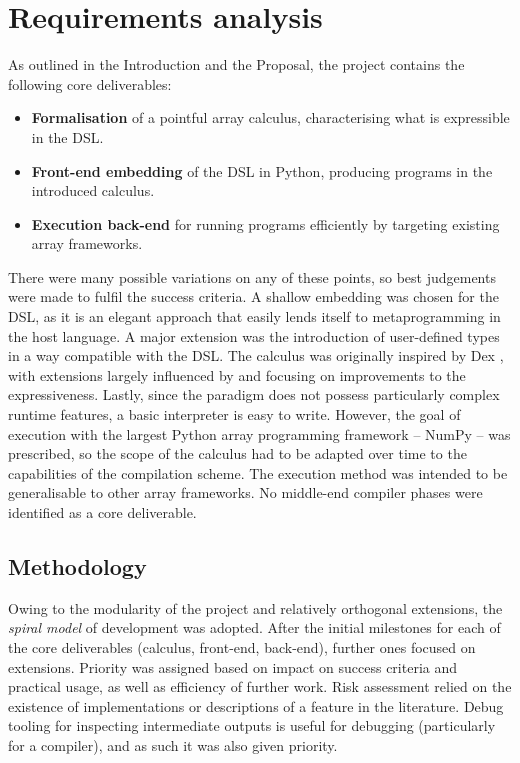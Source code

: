\section{Requirements analysis}
\label{requirements-analysis}

As outlined in the Introduction and the Proposal, the project contains the following core deliverables:
\begin{itemize}
    \item \textbf{Formalisation} of a pointful array calculus, characterising what is expressible in the DSL.
    \item \textbf{Front-end embedding} of the DSL in Python, producing programs in the introduced calculus.
    \item \textbf{Execution back-end} for running programs efficiently by targeting existing array frameworks.
\end{itemize}
There were many possible variations on any of these points, so best judgements were made to fulfil the success criteria. A shallow embedding was chosen for the DSL, as it is an elegant approach that easily lends itself to metaprogramming in the host language. A major extension was the introduction of user-defined types in a way compatible with the DSL. The calculus was originally inspired by Dex \cite{paszke2021getting}, with extensions largely influenced by \textcite{shaikhha2019efficient} and focusing on improvements to the expressiveness. Lastly, since the paradigm does not possess particularly complex runtime features, a basic interpreter is easy to write. However, the goal of execution with the largest Python array programming framework -- NumPy -- was prescribed, so the scope of the calculus had to be adapted over time to the capabilities of the compilation scheme. The execution method was intended to be generalisable to other array frameworks. No middle-end compiler phases were identified as a core deliverable.

\subsection{Methodology}

Owing to the modularity of the project and relatively orthogonal extensions, the \textit{spiral model} of development was adopted. After the initial milestones for each of the core deliverables (calculus, front-end, back-end), further ones focused on extensions. Priority was assigned based on impact on success criteria and practical usage, as well as efficiency of further work. Risk assessment relied on the existence of implementations or descriptions of a feature in the literature. Debug tooling for inspecting intermediate outputs is useful for debugging (particularly for a compiler), and as such it was also given priority.

